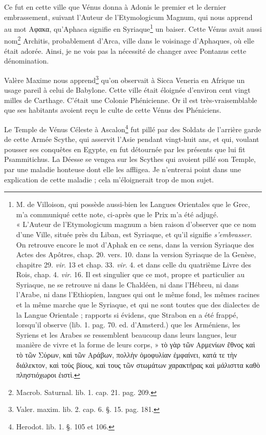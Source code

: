 \documentclass[a4paper, 11pt, oneside, polutonikogreek, french]{article}
\begin{document}
Ce fut en cette ville que Vénus donna à Adonis le premier et le dernier embrassement, suivant l'Auteur de l'Etymologicum Magnum, qui nous apprend au mot Αφακα, qu'Aphaca signifie en Syriaque\footnote{M. de Villoison, qui possède aussi-bien les Langues Orientales que le Grec, m'a communiqué cette note, ci-après que le Prix m'a été adjugé.\\\hspace*{5mm}« L'Auteur de l'Etymologicum magnum a bien raison d'observer que ce nom d'une Ville, située près du Liban, est Syriaque, et qu'il signifie \emph{s'embrasser}. On retrouve encore le mot d'Aphak en ce sens, dans la version Syriaque des Actes des Apôtres, chap. 20. vers. 10. dans la version Syriaque de la Genèse, chapitre 29. \emph{vir}. 13 et chap. 33. \emph{vir}. 4. et dans celle du quatrième Livre des Rois, chap. 4. \emph{vir}. 16. Il est singulier que ce mot, propre et particulier au Syriaque, ne se retrouve ni dans le Chaldéen, ni dans l'Hébreu, ni dans l'Arabe, ni dans l'Ethiopien, langues qui ont le même fond, les mêmes racines et la même marche que le Syriaque, et qui ne sont toutes que des dialectes de la Langue Orientale ; rapports si évidens, que Strabon en a été frappé, lorsqu'il observe (lib. 1. pag. 70. ed. d'Amsterd.) que les Arméniens, les Syriens et les Arabes se ressemblent beaucoup dans leurs langues, leur manière de vivre et la forme de leurs corps, » τὸ γὰρ τῶν Αρμενίων ἔθνος καὶ τὸ τῶν Σύρων, καὶ τῶν Αράβων, πολλὴν ὀμοφυλίαν ἐμφαίνει, κατά τε τὴν διάλεκτον, καὶ τοὺς βίους, καὶ τους τῶν στωμάτων χαρακτήρας καὶ μάλισττα καθὸ πληστιόχωροι ἐιστὶ.} un baiser. Cette Vénus avait aussi nom\footnote{Macrob. Saturnal. lib. 1. cap. 21. pag. 209.} Architis, probablement d'Arca, ville dans le voisinage d'Aphaques, où elle était adorée. Ainsi, je ne vois pas la nécessité de changer avec Pontanus cette dénomination.

Valère Maxime nous apprend\footnote{Valer. maxim. lib. 2. cap. 6. §. 15. pag. 181.} qu'on observait à Sicca Veneria en Afrique un usage pareil à celui de Babylone. Cette ville était éloignée d'environ cent vingt milles de Carthage. C'était une Colonie Phénicienne. Or il est très-vraisemblable que ses habitants avoient reçu le culte de cette Vénus des Phéniciens.

Le Temple de Vénus Céleste à Ascalon\footnote{Herodot. lib. 1. §. 105 et 106.} fut pillé par des Soldats de l'arrière garde de cette Armée Scythe, qui asservit l'Asie pendant vingt-huit ans, et qui, voulant pousser ses conquêtes en Egypte, en fut détournée par les présents que lui fit Psammitichus. La Déesse se vengea sur les Scythes qui avoient pillé son Temple, par une maladie honteuse dont elle les affligea. Je n'entrerai point dans une explication de cette maladie ; cela m'éloignerait trop de mon sujet.
\end{document}
